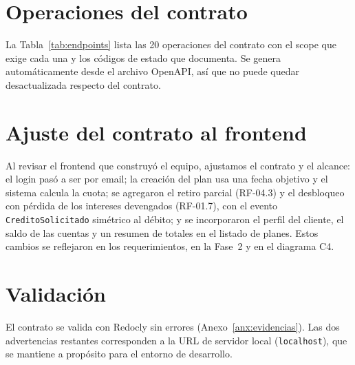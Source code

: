 \section{Operaciones del contrato}

La Tabla~\ref{tab:endpoints} lista las 20 operaciones del contrato con el scope que exige cada una y los códigos de estado que documenta. Se genera automáticamente desde el archivo OpenAPI, así que no puede quedar desactualizada respecto del contrato.



\section{Ajuste del contrato al frontend}

Al revisar el frontend que construyó el equipo, ajustamos el contrato y el alcance: el login pasó a ser por email; la creación del plan usa una fecha objetivo y el sistema calcula la cuota; se agregaron el retiro parcial (RF-04.3) y el desbloqueo con pérdida de los intereses devengados (RF-01.7), con el evento \texttt{CreditoSolicitado} simétrico al débito; y se incorporaron el perfil del cliente, el saldo de las cuentas y un resumen de totales en el listado de planes. Estos cambios se reflejaron en los requerimientos, en la Fase~2 y en el diagrama C4.

\section{Validación}

El contrato se valida con Redocly sin errores (Anexo~\ref{anx:evidencias}). Las dos advertencias restantes corresponden a la URL de servidor local (\texttt{localhost}), que se mantiene a propósito para el entorno de desarrollo.

